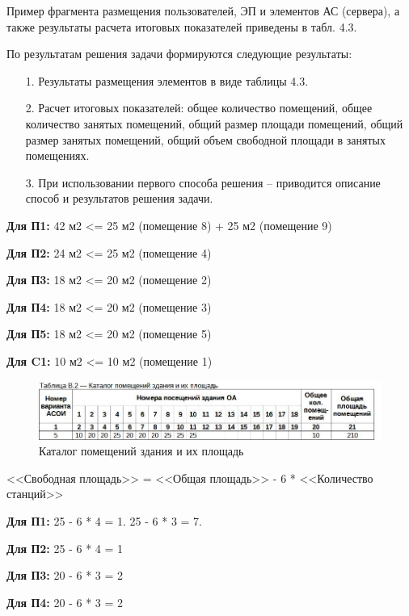 \documentclass[12pt, a4paper, simple]{eskdtext}
\begin{document}
    Пример фрагмента размещения пользователей, ЭП и элементов АС (сервера),
    а также ре­зультаты расчета итоговых показателей приведены в табл. 4.3.

    По результатам решения задачи формируются следующие результаты:
    \begin{enumerate}
        \item[1.] Результаты размещения элементов в виде таблицы 4.3.
        \item[2.] Расчет итоговых показателей: общее количество помещений,
        общее количество занятых помеще­ний, общий размер площади помещений,
        общий размер занятых помещений, общий объем свободной площади в занятых помещениях.
        \item[3.] При использовании первого способа решения – приводится описание способ и результатов реше­ния задачи.
    \end{enumerate}

    \newpage

    \textbf{Для П1:} 42 м2 <= 25 м2 (помещение 8) + 25 м2 (помещение 9)

    \textbf{Для П2:} 24 м2 <= 25 м2 (помещение 4)

    \textbf{Для П3:} 18 м2 <= 20 м2 (помещение 2)

    \textbf{Для П4:} 18 м2 <= 20 м2 (помещение 3)

    \textbf{Для П5:} 18 м2 <= 20 м2 (помещение 5)

    \textbf{Для C1:} 10 м2 <= 10 м2 (помещение 1)

    \begin{figure}[ht!]
        \centering
        \includegraphics[width=14cm]
            {_docs/ТаблицаВ2КаталогПомещенийЗданияИИхПлощадь.jpg}
        \caption{Каталог помещений здания и их площадь}
    \end{figure}

    <<Свободная площадь>> = <<Общая площадь>> - 6 * <<Количество станций>>

    \textbf{Для П1:} 25 - 6 * 4 = 1. 25 - 6 * 3 = 7.

    \textbf{Для П2:} 25 - 6 * 4 = 1

    \textbf{Для П3:} 20 - 6 * 3 = 2

    \textbf{Для П4:} 20 - 6 * 3 = 2
\end{document}
